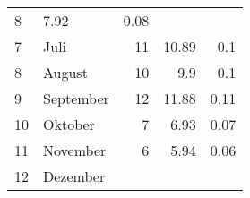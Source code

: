 \begin{longtable}{lXrrr}
       \num{8} &
       \num[round-mode=places,round-precision=2]{7,92} &
         \num[round-mode=places,round-precision=2]{0,08} \\

     7 &
     \multicolumn{1}{X}{ Juli   } &


       \num{11} &
       \num[round-mode=places,round-precision=2]{10,89} &
         \num[round-mode=places,round-precision=2]{0,1} \\

     8 &
     \multicolumn{1}{X}{ August   } &


       \num{10} &
       \num[round-mode=places,round-precision=2]{9,9} &
         \num[round-mode=places,round-precision=2]{0,1} \\

     9 &
     \multicolumn{1}{X}{ September   } &


       \num{12} &
       \num[round-mode=places,round-precision=2]{11,88} &
         \num[round-mode=places,round-precision=2]{0,11} \\

     10 &
     \multicolumn{1}{X}{ Oktober   } &


       \num{7} &
       \num[round-mode=places,round-precision=2]{6,93} &
         \num[round-mode=places,round-precision=2]{0,07} \\

     11 &
     \multicolumn{1}{X}{ November   } &


       \num{6} &
       \num[round-mode=places,round-precision=2]{5,94} &
         \num[round-mode=places,round-precision=2]{0,06} \\

     12 &
     \multicolumn{1}{X}{ Dezember   } &



\end{longtable}
